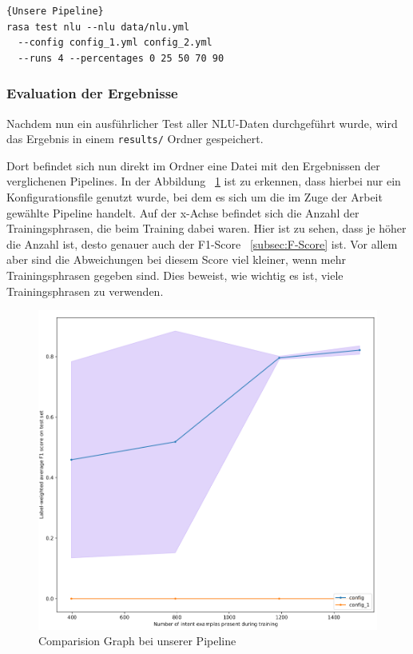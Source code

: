 \begin{lstlisting}[label={lst:comparing-pipelines-custom},caption={Unsere Pipeline}]{Unsere Pipeline}
rasa test nlu --nlu data/nlu.yml
  --config config_1.yml config_2.yml
  --runs 4 --percentages 0 25 50 70 90
\end{lstlisting}

\subsubsection{Evaluation der Ergebnisse}\label{subsubsec:evaluation-results}

Nachdem nun ein ausführlicher Test aller NLU-Daten durchgeführt wurde, wird das Ergebnis in einem \texttt{results/} Ordner gespeichert.\cite{interpretingTheOutput}

Dort befindet sich nun direkt im Ordner eine Datei mit den Ergebnissen der verglichenen Pipelines.
In der Abbildung ~\ref{fig:comparision_graph} ist zu erkennen, dass hierbei nur ein Konfigurationsfile genutzt wurde, bei dem es sich um die im Zuge der Arbeit gewählte Pipeline handelt.
Auf der x-Achse befindet sich die Anzahl der Trainingsphrasen, die beim Training dabei waren.
Hier ist zu sehen, dass je höher die Anzahl ist, desto genauer auch der F1-Score ~\ref{subsec:F-Score} ist.
Vor allem aber sind die Abweichungen bei diesem Score viel kleiner, wenn mehr Trainingsphrasen gegeben sind.
Dies beweist, wie wichtig es ist, viele Trainingsphrasen zu verwenden.

\begin{figure}[hbt!]
    \centering
    \includegraphics[scale=0.4]{pics/comparision_graph}
    \caption{Comparision Graph bei unserer Pipeline}
    \label{fig:comparision_graph}
\end{figure}

